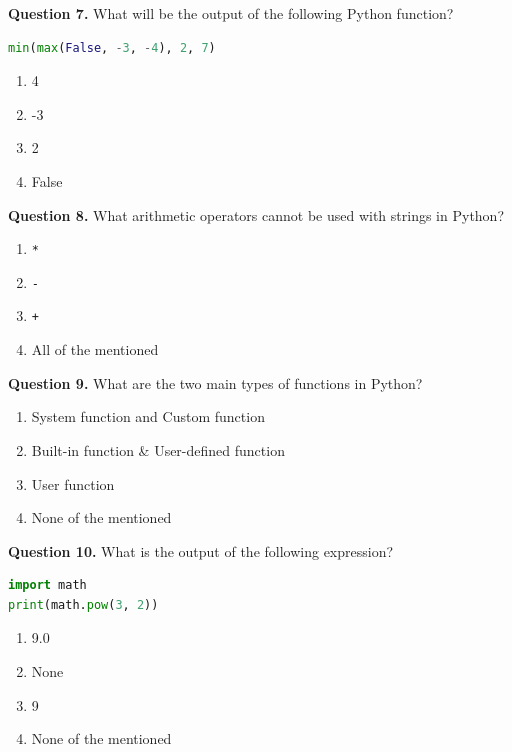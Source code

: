 \documentclass[11pt,a4paper]{article}
\begin{document}
\medskip


\noindent   \textbf{Question 7.} What will be the output of the following Python function?

\begin{lstlisting}[language=Python]
min(max(False, -3, -4), 2, 7)
\end{lstlisting}

\begin{enumerate}[label=(\alph*),itemsep=2pt]
  \item 4
  \item -3
  \item 2
  \item False
\end{enumerate}

\medskip


\noindent   \textbf{Question 8.} What arithmetic operators cannot be used with strings in Python?

\begin{enumerate}[label=(\alph*),itemsep=2pt]
  \item   \texttt{*}
  \item   \texttt{-}
  \item   \texttt{+}
  \item All of the mentioned
\end{enumerate}

\medskip


\noindent   \textbf{Question 9.} What are the two main types of functions in Python?

\begin{enumerate}[label=(\alph*),itemsep=2pt]
  \item System function and Custom function
  \item Built-in function \& User-defined function
  \item User function
  \item None of the mentioned
\end{enumerate}

\medskip


\noindent   \textbf{Question 10.} What is the output of the following expression?

\begin{lstlisting}[language=Python]
import math
print(math.pow(3, 2))
\end{lstlisting}

\begin{enumerate}[label=(\alph*),itemsep=2pt]
  \item 9.0
  \item None
  \item 9
  \item None of the mentioned
\end{enumerate}
\end{document}
